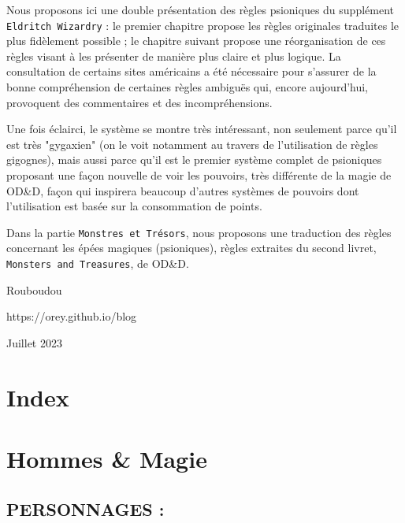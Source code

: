 \documentclass[11pt]{article}
\begin{document}
Nous proposons ici une double présentation des règles psioniques du supplément \texttt{Eldritch Wizardry} : le premier chapitre propose les règles originales traduites le plus fidèlement possible ; le chapitre suivant propose une réorganisation de ces règles visant à les présenter de manière plus claire et plus logique. La consultation de certains sites américains a été nécessaire pour s'assurer de la bonne compréhension de certaines règles ambiguës qui, encore aujourd'hui, provoquent des commentaires et des incompréhensions.

Une fois éclairci, le système se montre très intéressant, non seulement parce qu'il est très "gygaxien" (on le voit notamment au travers de l'utilisation de règles gigognes), mais aussi parce qu'il est le premier système complet de psioniques proposant une façon nouvelle de voir les pouvoirs, très différente de la magie de OD\&D, façon qui inspirera beaucoup d'autres systèmes de pouvoirs dont l'utilisation est basée sur la consommation de points.

Dans la partie \texttt{Monstres et Trésors}, nous proposons une traduction des règles concernant les épées magiques (psioniques), règles extraites du second livret, \texttt{Monsters and Treasures}, de OD\&D.

\vspace{1cm}

\noindent Rouboudou

\noindent https://orey.github.io/blog

\noindent Juillet 2023

\newpage

\section*{Index}

\newpage

\section*{Hommes \& Magie}

\subsection*{{\normalsize PERSONNAGES :}}
\end{document}
